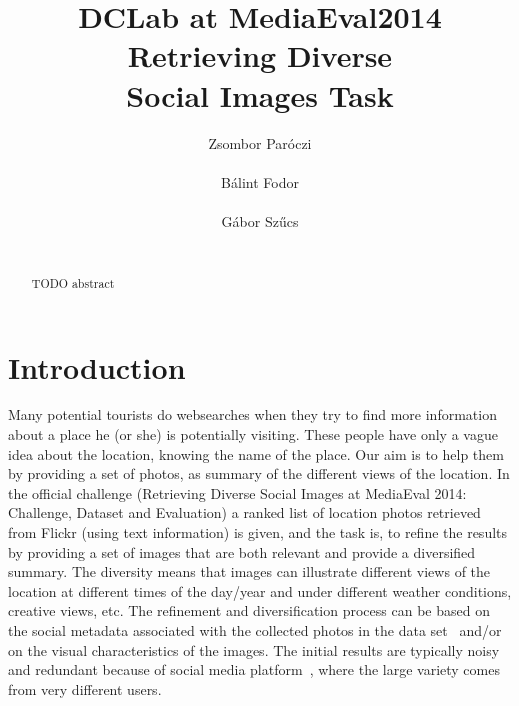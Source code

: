 \documentclass{acm_proc_article-me}
\begin{document}

\title{DCLab at MediaEval2014 Retrieving Diverse \\ Social Images Task}


\author{
\alignauthor
Zsombor Par\'oczi\\
       \\
\alignauthor
B\'alint Fodor\\
       \\
\alignauthor
G\'abor Sz\H ucs \\
       \\
}

\maketitle
\begin{abstract}
TODO abstract
\end{abstract}

\section{Introduction}

Many potential tourists do websearches when they try to find more information about a place he (or she) is potentially visiting. These people have only a vague idea about the location, knowing the name of the place. Our aim is to help them by providing a set of photos, as summary of the different views of the location. 
In the official challenge (Retrieving Diverse Social Images at MediaEval 2014: Challenge, Dataset and Evaluation) \cite{ionescu2014retrieving} a ranked list of location photos retrieved from Flickr (using text information) is given, and the task is, to refine the results by providing a set of images that are both relevant and provide a diversified summary. The diversity means that images can illustrate different views of the location at different times of the day/year and under different weather conditions, creative views, etc. The refinement and diversification process can be based on the social metadata associated with the collected photos in the data set~\cite{ionescu2014div400} and/or on the visual characteristics of the images. The initial results are typically noisy and redundant because of social media platform~\cite{radu2014hybrid}, where the large variety comes from very different users. 
\end{document}
